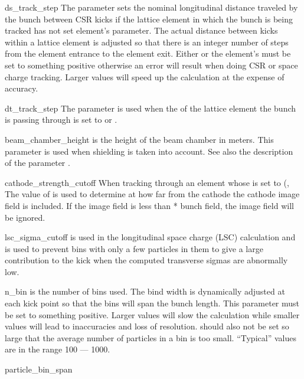 {\begin{description}
\item{ds_track_step} \Newline
The  parameter sets the nominal longitudinal distance traveled by the bunch
between CSR kicks if the lattice element in which the bunch is being tracked has not set element's
 parameter. The actual distance between kicks within a lattice element is adjusted
so that there is an integer number of steps from the element entrance to the element exit. Either
 or the element's  must be set to something positive otherwise
an error will result when doing CSR or space charge tracking. Larger values will speed up the
calculation at the expense of accuracy.
%
\item{dt_track_step} \Newline
The  parameter is used when the  of the lattice element the
bunch is passing through is set to  or . 
%
\item{beam_chamber_height} \Newline
{} is the height of the beam chamber in meters. This parameter is used when
shielding is taken into account.  See also the description of the parameter .
%
\item{cathode_strength_cutoff} \Newline
When tracking through an element whose  is set to 
(, The value of  is used to determine at how far
from the cathode the cathode image field is included. If the image field is less than
 * bunch field, the image field will be ignored.
%
\item{lsc_sigma_cutoff} \Newline
{} is used in the longitudinal space charge (LSC) calculation and is used to prevent
bins with only a few particles in them to give a large contribution to the kick when the computed
transverse sigmas are abnormally low.
%
\item{n_bin} \Newline
{} is the number of bins used. The bind width is dynamically adjusted at each kick point so
that the bins will span the bunch length.  This parameter must be set to something positive. Larger
values will slow the calculation while smaller values will lead to inaccuracies and loss of
resolution.  should also not be set so large that the average number of particles in a bin
is too small.  ``Typical'' values are in the range 100 --- 1000.
%
\item{particle_bin_span} \Newline

\end{description}}
